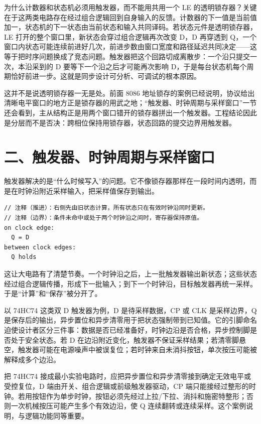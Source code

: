 为什么计数器和状态机必须用触发器，而不能用共用一个 LE 的透明锁存器？关键在于这两类电路存在经过组合逻辑回到自身输入的反馈。计数器的下一值是当前值加一，状态机的下一状态由当前状态和输入共同译码。若状态元件是透明锁存器，LE 打开的整个窗口里，新状态会穿过组合逻辑再次改变 D，D 再穿透到 Q，一个窗口内状态可能连续前进好几次，前进步数由窗口宽度和路径延迟共同决定——这等于把时序问题换成了竞态问题。触发器把这个回路切成离散步：一个沿只提交一次，本沿采到的 D 要等下一个沿之后才可能再次影响 D，于是每台状态机每个周期恰好前进一步。这就是同步设计可分析、可调试的根本原因。

这并不是说透明锁存器一无是处。前面 8086 地址锁存的案例已经说明，协议给出清晰电平窗口的地方正是锁存器的用武之地；“触发器、时钟周期与采样窗口”一节还会看到，主从结构正是用两个窗口错开的锁存器拼出一个触发器。工程结论因此是分层而不是否决：跨相位保持用锁存器，状态回路的提交边界用触发器。

\section{二、触发器、时钟周期与采样窗口}

触发器解决的是“什么时候写入”的问题。它不像锁存器那样在一段时间内透明，而是在时钟沿附近采样输入，把采样值保存到输出。

\begin{lstlisting}
// 注释（推进）：右侧先由旧状态计算，所有状态只在有效时钟沿同时更新。
// 注释（边界）：条件未命中或处于两个时钟沿之间时，寄存器保持原值。
on clock edge:
  Q = D
between clock edges:
  Q holds
\end{lstlisting}

这让大电路有了清楚节奏。一个时钟沿之后，上一批触发器输出新状态；这些状态经过组合逻辑传播，形成下一批输入；到下一个时钟沿，目标触发器再统一采样。于是“计算”和“保存”被分开了。

以 74HC74 这类双 D 触发器为例，D 是待采样数据，CP 或 CLK 是采样边界，Q 是保存后的输出，异步置位和异步清零用于把状态强制带到已知值。它的引脚命名迫使设计者区分三件事：数据是否已经准备好，时钟边沿是否合格，异步控制脚是否处于安全状态。若 D 在边沿附近变化，触发器不保证采样结果；若清零脚悬空，触发器可能在电源噪声中被误复位；若时钟来自未消抖按钮，单次按压可能被解释成多个边沿。

\begin{chipcase}
把 74HC74 接成最小实验电路时，应把异步置位和异步清零接到确定无效电平或受控复位，D 端由开关、组合逻辑或前级触发器驱动，CP 端只能接经过整形的时钟。若用按钮作为单步时钟，按钮必须先经过上拉/下拉、消抖和施密特整形；否则一次机械按压可能产生多个有效边沿，使 Q 连续翻转或连续采样。这个案例说明，与逻辑功能同等重要。
\end{chipcase}

